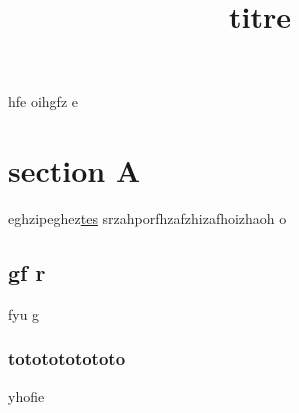 \documentclass{article}
\title{titre}
\begin{document}
\maketitle
hfe oihgfz e
\section{section A}{eghzipeghez\underline{\color{red}tes}
srzahporfhzafzhizafhoizhaoh o\subsection{gf r}{fyu g\subsubsection{tototototototo}{yhofie}
}}
\end{document}
